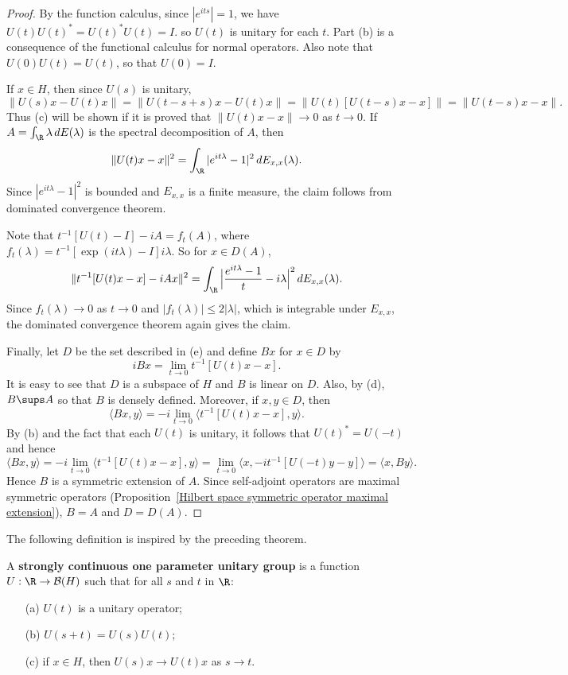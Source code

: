 \begin{proof}
By the function calculus, since $|e^{its}|=1$, we have $U(t)U(t)^*=U(t)^*U(t)=I$. so $U(t)$ is unitary for each $t$. Part (b) is a consequence of the functional calculus for normal operators. Also note that $U(0)U(t)=U(t)$, so that $U(0)=I$.\par
If $x\in H$, then since $U(s)$ is unitary,
\[\|U(s)x-U(t)x\|=\|U(t-s+s)x-U(t)x\|=\|U(t)[U(t-s)x-x]\|=\|U(t-s)x-x\|.\]
Thus (c) will be shown if it is proved that $\|U(t)x-x\|\to 0$ as $t\to 0$. If $A=\int_\R\lambda\,dE(\lambda)$ is the spectral decomposition of $A$, then
\[\|U(t)x-x\|^2=\int_\R|e^{it\lambda}-1|^2\,dE_{x,x}(\lambda).\]
Since $|e^{it\lambda}-1|^2$ is bounded and $E_{x,x}$ is a finite measure, the claim follows from dominated convergence theorem.\par
Note that $t^{-1}[U(t)-I]-iA=f_t(A)$, where $f_t(\lambda)=t^{-1}[\exp(it\lambda)-I]i\lambda$. So for $x\in D(A)$,
\[\|t^{-1}[U(t)x-x]-iAx\|^2=\int_\R\Big|\frac{e^{it\lambda}-1}{t}-i\lambda\Big|^2\,dE_{x,x}(\lambda).\]
Since $f_t(\lambda)\to 0$ as $t\to 0$ and $|f_t(\lambda)|\leq 2|\lambda|$, which is integrable under $E_{x,x}$, the dominated convergence theorem again gives the claim.\par
Finally, let $D$ be the set described in (e) and define $Bx$ for $x\in D$ by
\[iBx=\lim_{t\to 0}t^{-1}[U(t)x-x].\]
It is easy to see that $D$ is a subspace of $H$ and $B$ is linear on $D$. Also, by (d), $B\sups A$ so that $B$ is densely defined. Moreover, if $x,y\in D$, then
\[\langle Bx,y\rangle=-i\lim_{t\to 0}\langle t^{-1}[U(t)x-x],y\rangle.\]
By (b) and the fact that each $U(t)$ is unitary, it follows that $U(t)^*=U(-t)$ and hence
\[\langle Bx,y\rangle=-i\lim_{t\to 0}\langle t^{-1}[U(t)x-x],y\rangle=\lim_{t\to 0}\langle x,-it^{-1}[U(-t)y-y]\rangle=\langle x,By\rangle.\]
Hence $B$ is a symmetric extension of $A$. Since self-adjoint operators are maximal symmetric operators (Proposition~\ref{Hilbert space symmetric operator maximal extension}), $B=A$ and $D=D(A)$.
\end{proof}
The following definition is inspired by the preceding theorem.
\begin{definition}
A \textbf{strongly continuous one parameter unitary group} is a function $U:\R\to\mathcal{B}(H)$ such that for all $s$ and $t$ in $\R$:
\begin{itemize}
\item[(a)] $U(t)$ is a unitary operator;
\item[(b)] $U(s+t)=U(s)U(t)$;
\item[(c)] if $x\in H$, then $U(s)x\to U(t)x$ as $s\to t$.
\end{itemize}
\end{definition}
